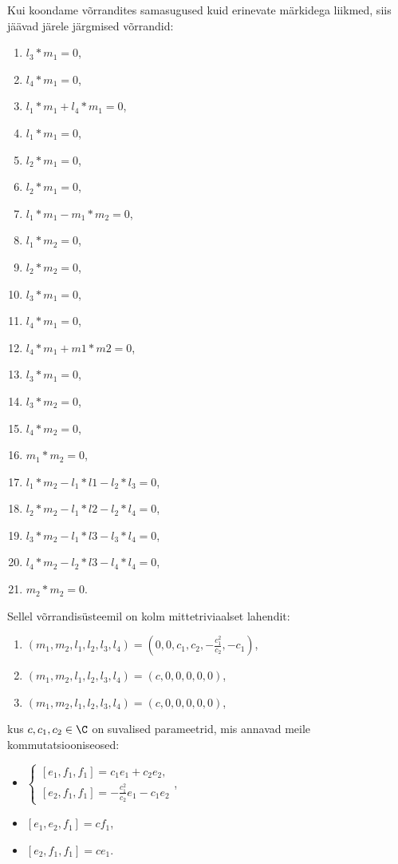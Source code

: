 Kui koondame võrrandites samasugused kuid erinevate märkidega liikmed, siis
jäävad järele järgmised võrrandid:
\begin{enumerate}
    \item $l_3*m_1 = 0$,
    \item $l_4*m_1 = 0$,
    \item $l_1*m_1 + l_4*m_1 = 0$,
    \item $l_1*m_1 = 0$,
    \item $l_2*m_1 = 0$,
    \item $l_2*m_1 = 0$,
    \item $l_1*m_1 - m_1*m_2 = 0$,
    \item $l_1*m_2 = 0$,
    \item $l_2*m_2 = 0$,
    \item $l_3*m_1 = 0$,
    \item $l_4*m_1 = 0$,
    \item $l_4*m_1 + m1*m2 = 0$,
    \item $l_3*m_1 = 0$,
    \item $l_3*m_2 = 0$,
    \item $l_4*m_2 = 0$,
    \item $m_1*m_2 = 0$,
    \item $l_1*m_2 - l_1*l1 - l_2*l_3 = 0$,
    \item $l_2*m_2 - l_1*l2 - l_2*l_4 = 0$,
    \item $l_3*m_2 - l_1*l3 - l_3*l_4 = 0$,
    \item $l_4*m_2 - l_2*l3 - l_4*l_4 = 0$,
    \item $m_2*m_2 = 0$.
\end{enumerate}

Sellel võrrandisüsteemil on kolm mittetriviaalset lahendit:
\begin{enumerate}
    \item $\left( m_1, m_2, l_1, l_2, l_3, l_4 \right) = \left( 0, 0, c_1, c_2, -\frac{c_1^2}{c_2}, -c_1 \right)$,
    \item $\left( m_1, m_2, l_1, l_2, l_3, l_4 \right) = \left( c, 0, 0, 0, 0, 0 \right)$,
    \item $\left( m_1, m_2, l_1, l_2, l_3, l_4 \right) = \left( c, 0, 0, 0, 0, 0 \right)$,
\end{enumerate}
kus $c, c_1, c_2 \in \C$ on suvalised parameetrid, mis annavad meile kommutatsiooniseosed:
\begin{itemize}
    \item $\begin{cases}
              \left[ e_1, f_1, f_1 \right] = c_1 e_1 + c_2 e_2,\\
              \left[ e_2, f_1, f_1 \right] = -\frac{c_1^2}{c_2} e_1 - c_1 e_2
          \end{cases}$,
    \item $\left[ e_1, e_2, f_1 \right] = c f_1$,
    \item $\left[ e_2, f_1, f_1 \right] = c e_1$.
\end{itemize}

